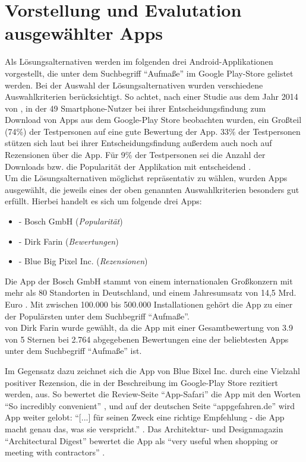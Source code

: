 \section{Vorstellung und Evalutation ausgewählter Apps}\label{sec:evaluation}
Als Lösungsalternativen werden im folgenden drei Android-Applikationen vorgestellt, die unter dem Suchbegriff ``Aufmaße'' im Google Play-Store gelistet werden.
Bei der Auswahl der Lösungsalternativen wurden verschiedene Auswahlkriterien berücksichtigt.
So achtet, nach einer Studie aus dem Jahr 2014 von \citeauthor{Dogruel14}, in der 49 Smartphone-Nutzer bei ihrer Entscheidungsfindung zum Download von Apps aus dem Google-Play Store beobachten wurden, ein Großteil (74\%) der Testpersonen auf eine gute Bewertung der App.
33\% der Testpersonen stützen sich laut \citeauthor{Dogruel14} bei ihrer Entscheidungsfindung außerdem auch noch auf Rezensionen über die App.
Für 9\% der Testpersonen sei die Anzahl der Downloads bzw. die Popularität der Applikation mit entscheidend \citep{Dogruel14}. \\

Um die Lösungsalternativen möglichst repräsentativ zu wählen, wurden Apps ausgewählt, die jeweils eines der oben genannten Auswahlkriterien besonders gut erfüllt. 
Hierbei handelt es sich um folgende drei Apps:

\begin{itemize}
  \item \mm{} - Bosch GmbH (\textit{Popularität})
  \item \im{} - Dirk Farin (\textit{Bewertungen})
  \item \pm{} - Blue Big Pixel Inc. (\textit{Rezensionen})
\end{itemize}

\noindent
Die App \mm{} der Bosch GmbH stammt von einem internationalen Großkonzern mit mehr als 80 Standorten in Deutschland, und einem Jahresumsatz von 14,5 Mrd. Euro \citep{Bosch18}.
Mit zwischen 100.000 bis 500.000 Installationen gehört die App zu einer der Populärsten unter dem Suchbegriff ``Aufmaße''. \\

\im{} von Dirk Farin wurde gewählt, da die App mit einer Gesamtbewertung von 3.9 von 5 Sternen bei 2.764 abgegebenen Bewertungen eine der beliebtesten Apps unter dem Suchbegriff ``Aufmaße'' ist.

Im Gegensatz dazu zeichnet sich die App \pm{} von Blue Bixel Inc. durch eine Vielzahl positiver Rezension, die in der Beschreibung im Google-Play Store rezitiert werden, aus.
So bewertet die Review-Seite ``App-Safari'' die App mit den Worten ``So incredibly convenient'' \citep{AppSafari18}, und auf der deutschen Seite ``appgefahren.de'' wird App weiter gelobt: 
``[...] für seinen Zweck eine richtige Empfehlung - die App macht genau das, was sie verspricht.'' \citep{Appgefahren18}.
Das Architektur- und Designmagazin ``Architectural Digest'' bewertet die App als ``very useful when shopping or meeting with contractors'' \citep{Architekt18}.


